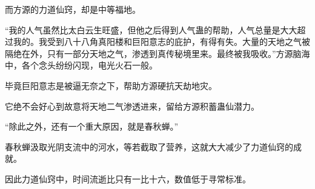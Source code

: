 \begin{this_body}
而方源的力道仙窍，却是中等福地。

“我的人气虽然比太白云生旺盛，但他之后得到人气蛊的帮助，人气总量是大大超过我的。我受到八十八角真阳楼和巨阳意志的庇护，有得有失。大量的天地之气被隔绝在外，只有一部分天地之气，渗透到真传秘境里来。最终被我吸收。”方源脑海中，各个念头纷纷闪现，电光火石一般。

毕竟巨阳意志是被逼无奈之下，帮助方源硬抗天劫地灾。

它绝不会好心到故意将天地二气渗透进来，留给方源积蓄蛊仙潜力。

“除此之外，还有一个重大原因，就是春秋蝉。”

春秋蝉汲取光阴支流中的河水，等若截取了营养，这就大大减少了力道仙窍的成就。

因此力道仙窍中，时间流逝比只有一比十六，数值低于寻常标准。

\end{this_body}

